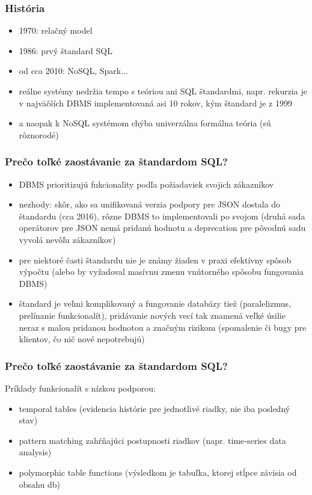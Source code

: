 \documentclass[12pt]{beamer}
\begin{document}
\begin{frame}
\frametitle{História}
\begin{itemize}
\item 1970: relačný model
\item 1986: prvý štandard SQL
\item od cca 2010: NoSQL, Spark...
\pause
\item reálne systémy nedržia tempo s teóriou ani SQL štandardmi,
    napr. rekurzia je v najväčších DBMS implementovaná asi 10 rokov, kým štandard je z 1999
\item a naopak k NoSQL systémom chýba univerzálna formálna teória (sú rôznorodé)
\end{itemize}
\end{frame}

\begin{frame}
\frametitle{Prečo toľké zaostávanie za štandardom SQL?}
\begin{itemize}
\item DBMS prioritizujú fukcionality podľa požiadaviek svojich zákazníkov
\item nezhody: skôr, ako sa unifikovaná verzia podpory pre JSON dostala do štandardu (cca 2016), rôzne DBMS to implementovali po svojom
(druhá sada operátorov pre JSON nemá pridanú hodnotu a deprecation pre pôvodnú sadu vyvolá nevôľu zákazníkov)
\item pre niektoré časti štandardu nie je známy žiaden v praxi efektívny spôsob výpočtu (alebo by vyžadoval masívnu zmenu vnútorného spôsobu fungovania DBMS)
\item štandard je veľmi komplikovaný a fungovanie databázy tiež (paralelizmus, prelínanie funkcionalít), pridávanie nových vecí tak znamená veľké úsilie neraz s malou pridanou hodnotou a značným rizikom (spomalenie či bugy pre klientov, čo nič nové nepotrebujú)
\end{itemize}
\end{frame}

\begin{frame}
\frametitle{Prečo toľké zaostávanie za štandardom SQL?}
Príklady funkcionalít s nízkou podporou:
\begin{itemize}
\item temporal tables (evidencia histórie pre jednotlivé riadky, nie iba posledný stav)
\item pattern matching zahŕňajúci postupnosti riadkov (napr. time-series data analysis)
\item polymorphic table functions (výsledkom je tabuľka, ktorej stĺpce závisia od obsahu db)
\end{itemize}
\end{frame}
\end{document}
